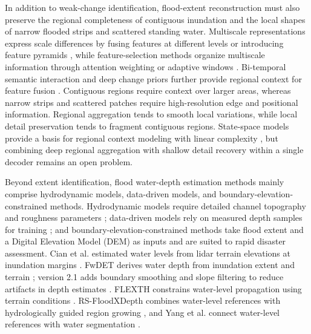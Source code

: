 \documentclass[authoryear,preprint,12pt]{elsarticle}
\begin{document}
In addition to weak-change identification, flood-extent reconstruction must also preserve the regional completeness of contiguous inundation and the local shapes of narrow flooded strips and scattered standing water. Multiscale representations express scale differences by fusing features at different levels or introducing feature pyramids \citep{wu2022msdeeplab,zhao2023siamdwenet,tahermanesh2025siscnet}, while feature-selection methods organize multiscale information through attention weighting or adaptive windows \citep{yadav2022attentive,zhu2025globalfloodsar}. Bi-temporal semantic interaction and deep change priors further provide regional context for feature fusion \citep{chen2021remote,han2023change}. Contiguous regions require context over larger areas, whereas narrow strips and scattered patches require high-resolution edge and positional information. Regional aggregation tends to smooth local variations, while local detail preservation tends to fragment contiguous regions. State-space models provide a basis for regional context modeling with linear complexity \citep{gu2023mamba,liu2024vmamba,chen2024changemamba}, but combining deep regional aggregation with shallow detail recovery within a single decoder remains an open problem.

Beyond extent identification, flood water-depth estimation methods mainly comprise hydrodynamic models, data-driven models, and boundary-elevation-constrained methods. Hydrodynamic models require detailed channel topography and roughness parameters \citep{teng2017floodInundationUncertainty}; data-driven models rely on measured depth samples for training \citep{chu2025urbanDepth}; and boundary-elevation-constrained methods take flood extent and a Digital Elevation Model (DEM) as inputs and are suited to rapid disaster assessment. Cian et al. estimated water levels from lidar terrain elevations at inundation margins \citep{cian2018flood}. FwDET derives water depth from inundation extent and terrain \citep{cohen2018estimating}; version 2.1 adds boundary smoothing and slope filtering to reduce artifacts in depth estimates \citep{cohen2022sensitivity}. FLEXTH constrains water-level propagation using terrain conditions \citep{betterle2024water}. RS-FloodXDepth combines water-level references with hydrologically guided region growing \citep{tian2026floodxdepth}, and Yang et al. connect water-level references with water segmentation \citep{yang2026csmamba}.
\end{document}

